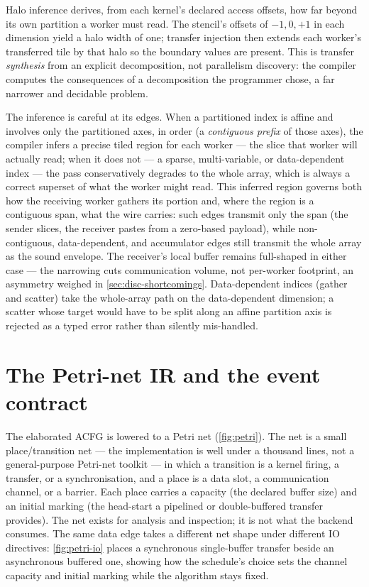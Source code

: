 Halo inference derives, from each kernel's declared access offsets, how far beyond
its own partition a worker must read. The stencil's offsets of $-1,0,+1$ in each
dimension yield a halo width of one; transfer injection then extends each
worker's transferred tile by that halo so the boundary values are present. This is
transfer \emph{synthesis} from an explicit decomposition, not parallelism
discovery: the compiler computes the consequences of a decomposition the
programmer chose, a far narrower and decidable problem.

The inference is careful at its edges. When a partitioned index is affine and
involves only the partitioned axes, in order (a \emph{contiguous prefix} of those
axes), the compiler infers a precise tiled region for each worker --- the slice that
worker will actually read; when it does not --- a sparse, multi-variable, or
data-dependent index --- the pass conservatively degrades to the whole array, which
is always a correct superset of what the worker might read. This inferred region
governs both how the receiving worker gathers its portion and, where the
region is a contiguous span, what the wire carries: such edges transmit
only the span (the sender slices, the receiver pastes from a
zero-based payload), while non-contiguous, data-dependent, and
accumulator edges still transmit the whole array as the sound
envelope. The receiver's local buffer remains full-shaped in either
case --- the narrowing cuts communication volume, not per-worker
footprint, an asymmetry weighed in \cref{sec:disc-shortcomings}. Data-dependent indices
(gather and scatter) take the whole-array path on the data-dependent dimension; a
scatter whose target would have to be split along an affine partition axis is
rejected as a typed error rather than silently mis-handled.

\section{The Petri-net IR and the event contract}\label{sec:arch-petri}

The elaborated ACFG is lowered to a Petri net (\cref{fig:petri}). The net is a
small place/transition net --- the implementation is well under a thousand lines,
not a general-purpose Petri-net toolkit --- in which a transition is a
kernel firing, a transfer, or a synchronisation, and a place is a data slot, a
communication channel, or a barrier. Each place carries a capacity (the declared
buffer size) and an initial marking (the head-start a pipelined or double-buffered
transfer provides). The net exists for analysis and inspection; it is not what the
backend consumes. The same data edge takes a different net shape under different IO
directives: \cref{fig:petri-io} places a synchronous single-buffer transfer beside
an asynchronous buffered one, showing how the schedule's choice sets the channel
capacity and initial marking while the algorithm stays fixed.


